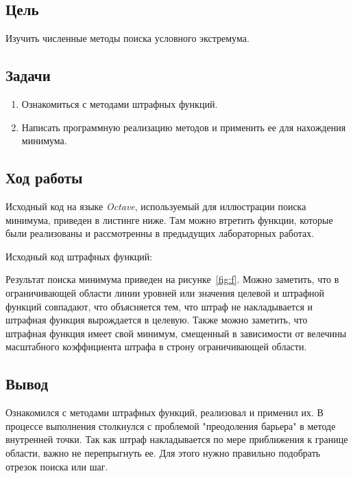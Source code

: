 



    
\newcommand{\labn}{10}


\subsection*{Цель}

Изучить численные методы поиска условного экстремума.

\subsection*{Задачи}

\begin{enumerate}
    \item Ознакомиться с методами штрафных функций.
    \item Написать программную реализацию методов и применить ее для нахождения минимума.
\end{enumerate}

\subsection*{Ход работы}

Исходный код на языке \textit{Octave}, используемый для иллюстрации поиска минимума, приведен в листинге ниже. Там можно втретить функции, которые были реализованы и рассмотренны в предыдущих лабораторных работах.

Исходный код штрафных функций:

Результат поиска минимума приведен на рисунке~\ref{fig:f}.
Можно заметить, что в ограничивающей области линии уровней или значения целевой и штрафной функций совпадают, что объясняется тем, что штраф не накладывается и штрафная функция вырождается в целевую.
Также можно заметить, что штрафная функция имеет свой минимум, смещенный в зависимости от велечины масштабного коэффициента штрафа в строну ограничивающей области.

\subsection*{Вывод}

Ознакомился с методами штрафных функций, реализовал и применил их.
В процессе выполнения столкнулся с проблемой "преодоления барьера" в методе внутренней точки. Так как штраф накладывается по мере приближения к границе области, важно не перепрыгнуть ее. Для этого нужно правильно подобрать отрезок поиска или шаг.


